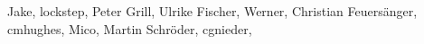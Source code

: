 Jake, %
lockstep, %
Peter Grill, %
Ulrike Fischer, %
Werner, %
Christian Feuersänger, %
cmhughes, %
Mico, %
Martin Schröder, %
cgnieder, %
